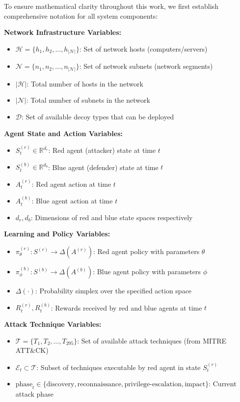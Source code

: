 \documentclass[12pt]{article}
\newcounter{phase}[algorithm]
\theoremstyle{definition}
\theoremstyle{plain}
\begin{document}
To ensure mathematical clarity throughout this work, we first establish comprehensive notation for all system components:

\textbf{Network Infrastructure Variables:}
\begin{itemize}
    \item $\mathcal{H} = \{h_1, h_2, \ldots, h_{|\mathcal{H}|}\}$: Set of network hosts (computers/servers)
    \item $\mathcal{N} = \{n_1, n_2, \ldots, n_{|\mathcal{N}|}\}$: Set of network subnets (network segments)
    \item $|\mathcal{H}|$: Total number of hosts in the network
    \item $|\mathcal{N}|$: Total number of subnets in the network
    \item $\mathcal{D}$: Set of available decoy types that can be deployed
\end{itemize}

\textbf{Agent State and Action Variables:}
\begin{itemize}
    \item $S^{(r)}_t \in \mathbb{R}^{d_r}$: Red agent (attacker) state at time $t$
    \item $S^{(b)}_t \in \mathbb{R}^{d_b}$: Blue agent (defender) state at time $t$
    \item $A^{(r)}_t$: Red agent action at time $t$
    \item $A^{(b)}_t$: Blue agent action at time $t$
    \item $d_r, d_b$: Dimensions of red and blue state spaces respectively
\end{itemize}

\textbf{Learning and Policy Variables:}
\begin{itemize}
    \item $\pi^{(r)}_\theta: S^{(r)} \to \Delta(A^{(r)})$: Red agent policy with parameters $\theta$
    \item $\pi^{(b)}_\phi: S^{(b)} \to \Delta(A^{(b)})$: Blue agent policy with parameters $\phi$
    \item $\Delta(\cdot)$: Probability simplex over the specified action space
    \item $R^{(r)}_t, R^{(b)}_t$: Rewards received by red and blue agents at time $t$
\end{itemize}

\textbf{Attack Technique Variables:}
\begin{itemize}
    \item $\mathcal{T} = \{T_1, T_2, \ldots, T_{295}\}$: Set of available attack techniques (from MITRE ATT\&CK)
    \item $\mathcal{E}_t \subset \mathcal{T}$: Subset of techniques executable by red agent in state $S^{(r)}_t$
    \item $\text{phase}_t \in \{\text{discovery}, \text{reconnaissance}, \text{privilege-escalation}, \text{impact}\}$: Current attack phase
\end{itemize}
\end{document}
